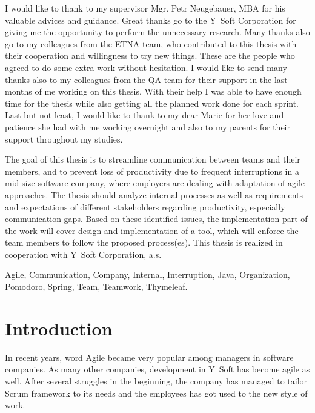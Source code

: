 \documentclass[11pt,singleside]{myfithesis2}
\begin{document}
\FrontMatter
\ThesisTitlePage
\begin{ThesisDeclaration}
\DeclarationText
\AdvisorName
\end{ThesisDeclaration}
\begin{ThesisThanks}
I would like to thank to my supervisor Mgr. Petr Neugebauer, MBA for his valuable advices and guidance. Great thanks go to the Y~Soft Corporation for giving me the opportunity to perform the unnecessary research. Many thanks also go to my colleagues from the ETNA team, who contributed to this thesis with their cooperation and willingness to try new things. These are the people who agreed to do some extra work without hesitation. I would like to send many thanks also to my colleagues from the QA team for their support in the last months of me working on this thesis. With their help I was able to have enough time for the thesis while also getting all the planned work done for each sprint. Last but not least, I would like to thank to my dear Marie for her love and patience she had with me working overnight and also to my parents for their support throughout my studies. 
\end{ThesisThanks}
\begin{ThesisAbstract}
The goal of this thesis is to streamline communication between teams and their members, and to prevent loss of productivity due to frequent interruptions in a mid-size software company, where employers are dealing with adaptation of agile approaches. The thesis should analyze internal processes as well as requirements and expectations of different stakeholders regarding productivity, especially communication gaps. Based on these identified issues, the implementation part of the work will cover design and implementation of a tool, which will enforce the team members to follow the proposed process(es). This thesis is realized in cooperation with Y~Soft Corporation, a.s.
\end{ThesisAbstract}
\begin{ThesisKeyWords}
Agile, Communication, Company, Internal, Interruption, Java, Organization, Pomodoro, Spring, Team, Teamwork, Thymeleaf.
\end{ThesisKeyWords}
\MainMatter
\tableofcontents %

\chapter{Introduction}
In recent years, word Agile became very popular among managers in software companies. As many other companies, development in Y~Soft has become agile as well. After several struggles in the beginning, the company has managed to tailor Scrum framework to its needs and the employees has got used to the new style of work.
\end{document}

